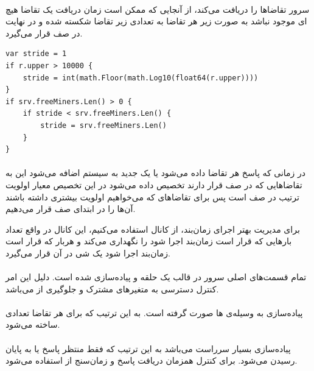 \documentclass[paper=a4, fontsize=11pt]{article}
\numberwithin{equation}{section} %
\numberwithin{figure}{section} %
\numberwithin{table}{section} %
\begin{document}
\paragraph{}
سرور تقاضاها را دریافت می‌کند، از آنجایی که ممکن است زمان دریافت یک تقاضا هیچ ای موجود نباشد
به صورت زیر هر تقاضا به تعدادی زیر تقاضا شکسته شده
و در نهایت در صف قرار می‌گیرد.

\begin{latin}
\begin{lstlisting}[caption=Partioning Algorithm]
var stride = 1
if r.upper > 10000 {
	stride = int(math.Floor(math.Log10(float64(r.upper))))
}
if srv.freeMiners.Len() > 0 {
	if stride < srv.freeMiners.Len() {
		stride = srv.freeMiners.Len()
	}
}
\end{lstlisting}
\end{latin}

\paragraph{}
در زمانی که پاسخ هر تقاضا داده می‌شود یا یک  جدید
به سیستم اضافه می‌شود
این  به تقاضاهایی که در صف قرار دارند تخصیص داده می‌شود
در این تخصیص معیار اولویت ترتیب در صف است
پس برای تقاضاهای  که می‌خواهیم اولویت بیشتری داشته باشند
آن‌ها را در ابتدای صف قرار می‌دهیم.

برای مدیریت بهتر اجرای زمان‌بند، از کانال 
استفاده می‌کنیم، این کانال در واقع تعداد بارهایی که قرار است
زمان‌بند اجرا شود را نگهداری می‌کند و هربار که قرار است
زمان‌بند اجرا شود یک شی در آن قرار می‌گیرد.

\paragraph{}
تمام قسمت‌های اصلی سرور در قالب یک حلقه و 
پیاده‌سازی شده است. دلیل این امر کنترل دسترسی به متغیرهای
مشترک و جلوگیری از 
می‌باشد.

\paragraph{}
پیاده‌سازی 
به وسیله‌ی ها صورت گرفته است.
به این ترتیب که برای هر تقاضا تعدادی 
ساخته می‌شود.

\paragraph{}
پیاده‌سازی  بسیار سرراست می‌باشد
به این ترتیب که فقط منتظر پاسخ یا به پایان رسیدن 
می‌شود. برای کنترل همزمان دریافت پاسخ و زمان‌سنج
از  استفاده می‌شود.
\end{document}
